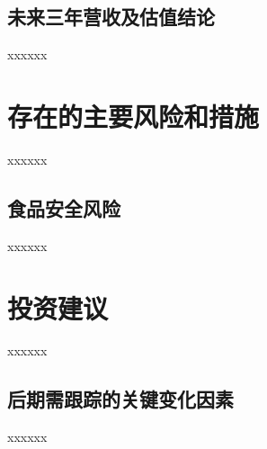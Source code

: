 \documentclass[a4paper,12pt,lang=cn,fontset = windows]{elegantpaper} %
\begin{document}
\subsection{未来三年营收及估值结论}
xxxxxx
\section{存在的主要风险和措施}
xxxxxx
\subsection{食品安全风险}
xxxxxx
\section{投资建议}
xxxxxx
\subsection{后期需跟踪的关键变化因素} %
xxxxxx
\end{document}
